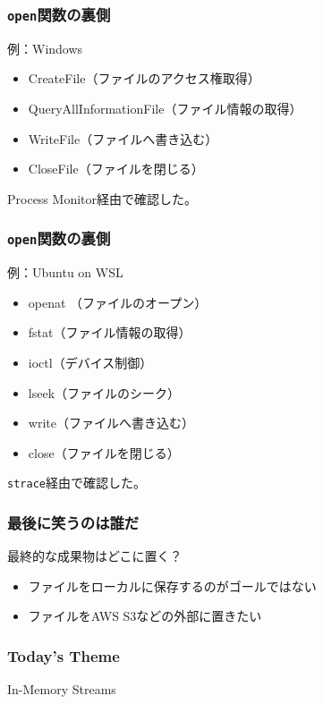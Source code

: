 \documentclass[aspectratio=169,dvipdfmx,14pt,notheorems]{beamer}
\theoremstyle{definition}
\begin{document}
\begin{frame}[fragile]\frametitle{\texttt{open}関数の裏側}

\begin{exampleblock}{例：Windows}
\begin{itemize}
\item CreateFile（ファイルのアクセス権取得）
\item QueryAllInformationFile（ファイル情報の取得）
\item WriteFile（ファイルへ書き込む）
\item CloseFile（ファイルを閉じる）
\end{itemize}
\end{exampleblock}
Process Monitor経由で確認した。
\end{frame}

\begin{frame}[fragile]\frametitle{\texttt{open}関数の裏側}

\begin{exampleblock}{例：Ubuntu on WSL}
\begin{itemize}
\item openat （ファイルのオープン）
\item fstat（ファイル情報の取得）
\item ioctl（デバイス制御）
\item lseek（ファイルのシーク）
\item write（ファイルへ書き込む）
\item close（ファイルを閉じる）
\end{itemize}
\end{exampleblock}
\texttt{strace}経由で確認した。

\end{frame}

\begin{frame}\frametitle{最後に笑うのは誰だ}
\begin{block}{最終的な成果物はどこに置く？}
\begin{itemize}
\item ファイルをローカルに保存するのがゴールではない
\item ファイルをAWS S3などの外部に置きたい
\end{itemize}
\end{block}
\end{frame}

\begin{frame}\frametitle{Today's Theme}
\begin{center}
\huge{In-Memory Streams}
\end{center}
\end{frame}
\end{document}
